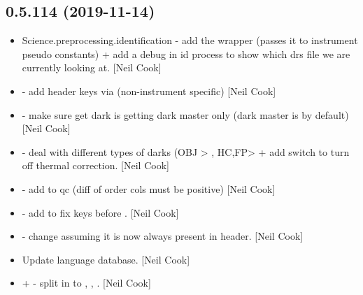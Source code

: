 \documentclass[a4paper,10pt,english]{report}
\begin{document}
\subsection{0.5.114 (2019-11-14)}
\label{\detokenize{misc/changelog:id29}}\begin{itemize}
\item {} 
Science.preprocessing.identification - add the  wrapper
(passes it to instrument pseudo constants) + add a debug in id process
to show which drs file we are currently looking at. {[}Neil Cook{]}

\item {} 
 - add header keys via 
(non-instrument specific) {[}Neil Cook{]}

\item {} 
 - make sure get dark is getting dark master only
(dark master is  by default) {[}Neil Cook{]}

\item {} 
 - deal with different types of darks (OBJ \textendash{}\textgreater{}
, HC,FP\textendash{}\textgreater{}  + add switch to turn off thermal
correction. {[}Neil Cook{]}

\item {} 
 - add  to qc (diff of order
cols must be positive) {[}Neil Cook{]}

\item {} 
 - add  to fix keys before
. {[}Neil Cook{]}

\item {} 
 - change  assuming it is now always
present in header. {[}Neil Cook{]}

\item {} 
Update language database. {[}Neil Cook{]}

\item {} 
 +  - split
 in to , , . {[}Neil
Cook{]}


\end{itemize}
\end{document}
